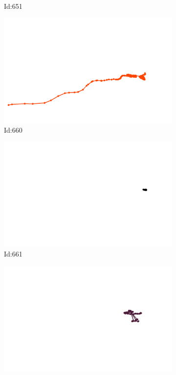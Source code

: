 \documentclass[12pt,twoside]{report}
\begin{document}
\begin{figure}
\begin{subfigure}[b]{0.20\textwidth}
\caption{Id:651}
\end{subfigure}
\begin{subfigure}[b]{0.20\textwidth}
\centering
\includegraphics[width=\textwidth]{../trajectories/660.png}
\caption{Id:660}
\end{subfigure}
\begin{subfigure}[b]{0.20\textwidth}
\centering
\includegraphics[width=\textwidth]{../trajectories/661.png}
\caption{Id:661}
\end{subfigure}
\begin{subfigure}[b]{0.20\textwidth}
\centering
\includegraphics[width=\textwidth]{../trajectories/662.png}

\end{subfigure}
\end{figure}
\end{document}
